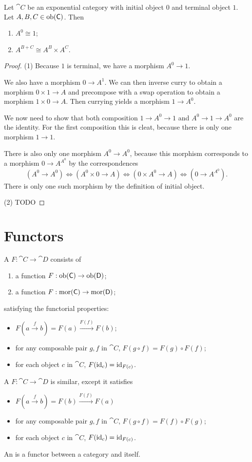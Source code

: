 \begin{proposition}
Let $\cat{C}$ be an exponential category with initial object $0$ and terminal object $1$. Let $A,B,C\in \operatorname{ob}(\mathsf{C})$. Then
\begin{enumerate}
\item $A^0 \cong 1$;
\item $A^{B + C} \cong A^B \times A^C$.
\end{enumerate}
\end{proposition}
\begin{proof}
(1) Because $1$ is terminal, we have a morphism $A^0\to 1$.

We also have a morphism $0 \to A^1$. We can then inverse curry to obtain a morphism $0\times 1 \to A$ and precompose with a swap operation to obtain a morphism $1\times 0 \to A$. Then currying yields a morphism $1 \to A^0$.

We now need to show that both composition $1\to A^0 \to 1$ and $A^0\to 1 \to A^0$ are the identity. For the first composition this is cleat, because there is only one morphism $1\to 1$.

There is also only one morphism $A^0\to A^0$, because this morphism corresponds to a morphism $0\to A^{A^0}$ by the correspondences
\[ (A^0 \to A^0) \iff (A^0\times 0 \to A) \iff (0\times A^0\to A) \iff (0\to A^{A^0}). \]
There is only one such morphism by the definition of initial object.

(2) TODO
\end{proof}

\section{Functors}
\begin{definition}
A  $F:\cat{C}\to\cat{D}$ consists of
\begin{enumerate}
\item a function $F: \operatorname{ob}(\mathsf{C}) \to \operatorname{ob}(\mathsf{D})$;
\item a function $F: \operatorname{mor}(\mathsf{C}) \to \operatorname{mor}(\mathsf{D})$;
\end{enumerate}
satisfying the functorial properties:
\begin{itemize}
\item $F(a \overset{f}{\longrightarrow} b) = F(a) \overset{F(f)}{\longrightarrow} F(b)$;
\item for any composable pair $g,f$ in $\cat{C}$, $F(g\circ f) = F(g)\circ F(f)$;
\item for each object $c$ in $\cat{C}$, $F(\operatorname{id}_c) = \operatorname{id}_{F(c)}$.
\end{itemize}
A  $F:\cat{C}\to\cat{D}$ is similar, except it satisfies
\begin{itemize}
\item $F(a \overset{f}{\longrightarrow} b) = F(b) \overset{F(f)}{\longrightarrow} F(a)$
\item for any composable pair $g,f$ in $\cat{C}$, $F(g\circ f) = F(f)\circ F(g)$;
\item for each object $c$ in $\cat{C}$, $F(\operatorname{id}_c) = \operatorname{id}_{F(c)}$.
\end{itemize}
An  is a functor between a category and itself.
\end{definition}

